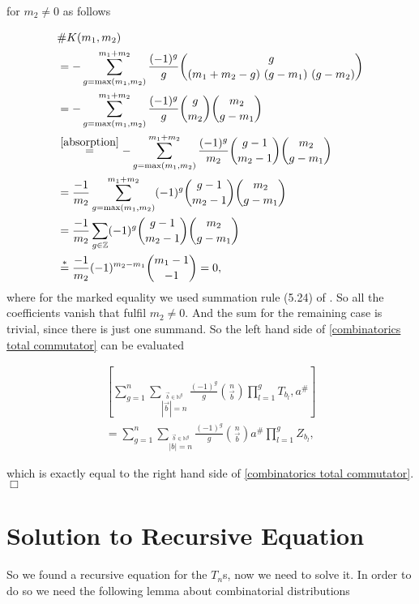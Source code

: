 \documentclass[b5paper,draft,openbib,12pt]{memoir}
\begin{document}
for \(m_2\neq 0\) as follows

\begin{align*}
&\#K(m_1,m_2) \\
&=-\sum_{g=\max(m_1,m_2)}^{m_1+m_2} \frac{(-1)^g}{g} \binom{g}{(m_1+m_2-g) \ (g-m_1) \ (g - m_2)}\\
&=-\sum_{g=\max(m_1,m_2)}^{m_1+m_2} \frac{(-1)^g}{g} \binom{g}{m_2}\binom{m_2}{g-m_1}\\
&\stackrel{\eqref{absorption}}{=}-\sum_{g=\max(m_1,m_2)}^{m_1+m_2} \frac{(-1)^g}{m_2} \binom{g-1}{m_2-1}\binom{m_2}{g-m_1}\\
&=\frac{-1}{m_2} \sum_{g=\max(m_1,m_2)}^{m_1+m_2} (-1)^g \binom{g-1}{m_2-1}\binom{m_2}{g-m_1}\\
&=\frac{-1}{m_2} \sum_{g\in\mathbb{Z}} (-1)^g \binom{g-1}{m_2-1}\binom{m_2}{g-m_1}\\
&\stackrel{*}{=} \frac{-1}{m_2} (-1)^{m_2-m_1} \binom{m_1-1}{-1} = 0,
\end{align*}
where for the marked equality we used summation rule (5.24) of \cite{graham1994concrete}. 
So all the coefficients vanish that fulfil \(m_2\neq 0\). And the sum for the remaining case
is trivial, since there is just one summand. So the left hand side of 
\eqref{combinatorics total commutator} can be evaluated

\begin{align*}
\left[\sum_{g=1}^n \sum_{\stackrel{\vec{b}\in\mathbb{N}^g}{|\vec{b}|=n}}\frac{(-1)^g}{g} 
\binom{n}{\vec{b}} \prod_{l=1}^g T_{b_l}, a^\#\right]\\
= \sum_{g=1}^n \sum_{\stackrel{\vec{b}\in\mathbb{N}^g}{|b|=n}} \frac{(-1)^g}{g} \binom{n}{\vec{b}}  a^\# \prod_{l=1}^g Z_{b_l},
\end{align*}

which is exactly equal to the right hand side of \eqref{combinatorics total commutator}. \(\Box\)

\section{Solution to Recursive Equation}

So we found a recursive equation for the \(T_n\)s, now we need to solve it. 
In order to do so we need the following lemma about combinatorial distributions
\end{document}
